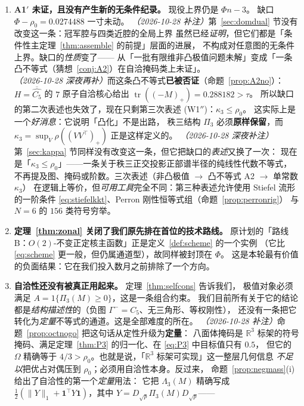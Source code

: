 \documentclass[UTF8,11pt]{ctexart}
\theoremstyle{definition}
\newcommand{\Lam}{\Lambda}
\newcommand{\tr}{\operatorname{tr}}
\newcommand{\R}{\mathbb{R}}
\newcommand{\one}{\mathbf{1}}
\begin{document}
\begin{enumerate}[leftmargin=1.8em,itemsep=4pt]
\item \textbf{A1$'$ 未证，且没有产生新的无条件纪录。} 现役上界仍是 $\Phi n-3$。
缺口 $\Phi-\rho_0=0.0274488$ 一寸未动。
\emph{（2026-10-28 补注）}第~\ref{sec:domdual} 节没有改变这一条：冠军腔与四类近腔的全局上界
虽然已经\emph{证明}，但它们都是「条件性主定理~\ref{thm:assemble} 的前提」层面的进展，
不构成对任意图的无条件上界。缺口的\emph{性质}变了——
从「一批有限维非凸极值问题未解」变成「一条凸不等式（猜想~\ref{conj:A2}）在自洽掩码类上未证」。
\emph{（2026-10-28 深夜再补）}而这条凸不等式\textbf{已被否证}（命题~\ref{prop:A2no}）：
$H=\overline{\widehat{C_5}}$ 的 $7$ 原子自洽核心给出 $\tr((-M)_+)=0.288182>\tau$。
所以缺口的第二次表述也失效了，现在只剩第三次表述 (W1$''$)：$\kappa_3\le\rho_0$。
这实际上是一个\emph{好消息}：它说明「凸化」不是出路，
秩三结构 $\Pi_3$ 必须\textbf{原样保留}，而 $\kappa_3=\sup_V\rho((VV^\top)_+)$ 正是这样定义的。
\emph{（2026-10-28 深夜补注）}第~\ref{sec:kappa} 节同样没有改变这一条，但它把缺口的\emph{表述}又换了一次：
现在是「$\kappa_3\le\rho_0$」——一条关于秩三正交投影正部谱半径的纯线性代数不等式，
不再提及图、掩码或阶数。三次表述（非凸极值 $\to$ 凸不等式 A2 $\to$ 单常数 $\kappa_3$）
在逻辑上等价，但\emph{可用工具}完全不同：第三种表述允许使用
Stiefel 流形的一阶条件 \eqref{eq:stiefelkkt}、Perron 刚性恒等式组（命题~\ref{prop:perronrig}）
与 $N=6$ 的 $156$ 类符号穷举。
\item \textbf{定理~\ref{thm:zonal} 关闭了我们原先排在首位的技术路线。}
原计划的「路线 B：$O(2)$-不变正定核主函数」正是定义~\ref{def:scheme} 的一个实例
（它比 \eqref{eq:scheme} 更一般，但仍属通道型），故同样被封顶在 $\Phi$。
这是本轮最有价值的负面结果：它在我们投入数月之前排除了一个方向。
\item \textbf{自洽性还没有被真正用起来。} 定理~\ref{thm:selfcons} 告诉我们，
极值对象必须满足 $A=1\{\Pi_3(M)\ge0\}$，这是一条组合约束。
我们目前所有关于它的结论都是\emph{结构描述性}的（负图 $\Gamma^-=C_5$、无三角形、等权刚性），
还没有一条把它转化为\emph{定量}不等式的通道。这是全部难度的所在。
\emph{（2026-10-28 补注）}命题~\ref{prop:octnogo} 把这句话从定性升级为\textbf{定量}：
八面体掩码是 $\R^3$ 标架的符号掩码、满足定理~\ref{thm:P3} 的归一化、在 \eqref{eq:P3} 中目标值只有 $0.5$，
但它的 $\Omega$ 精确等于 $4/3>\rho_0$。也就是说，「$\R^3$ 标架可实现」这一整层几何信息
\emph{不足以}把优占对偶压到 $\rho_0$；必须用自洽性本身。反过来，
命题~\ref{prop:negmass}(i) 给出了自洽性的第一个\emph{定量}用法：
它把 $\Lam_3(M)$ 精确写成 $\frac12(\|Y\|_1+\one^\top Y\one)$，其中 $Y=D_{\sqrt p}\Pi_3(M)D_{\sqrt p}$——

\end{enumerate}
\end{document}

